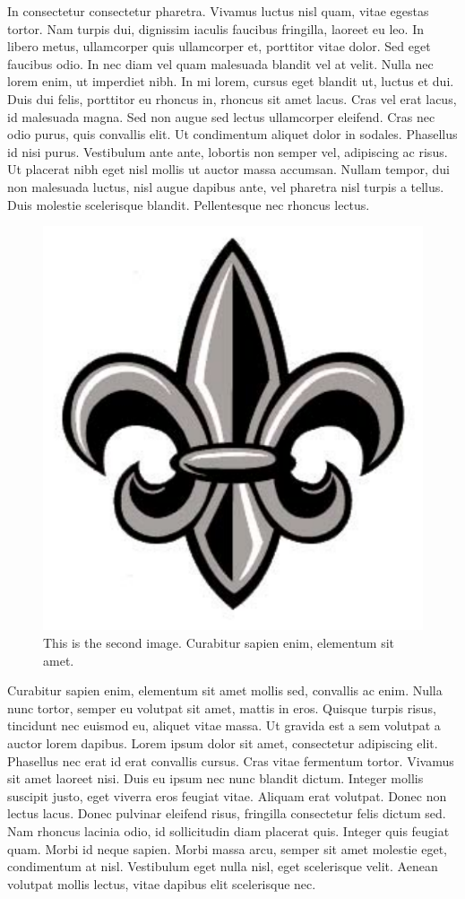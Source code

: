 \documentclass[12pt]{report}	%
\begin{document}
  In consectetur consectetur pharetra. Vivamus luctus nisl quam, vitae egestas tortor. Nam turpis dui, dignissim iaculis faucibus fringilla, laoreet eu leo. In libero metus, ullamcorper quis ullamcorper et, porttitor vitae dolor. Sed eget faucibus odio. In nec diam vel quam malesuada blandit vel at velit. Nulla nec lorem enim, ut imperdiet nibh. In mi lorem, cursus eget blandit ut, luctus et dui. Duis dui felis, porttitor eu rhoncus in, rhoncus sit amet lacus. Cras vel erat lacus, id malesuada magna. Sed non augue sed lectus ullamcorper eleifend. Cras nec odio purus, quis convallis elit. Ut condimentum aliquet dolor in sodales. Phasellus id nisi purus. Vestibulum ante ante, lobortis non semper vel, adipiscing ac risus. Ut placerat nibh eget nisl mollis ut auctor massa accumsan. Nullam tempor, dui non malesuada luctus, nisl augue dapibus ante, vel pharetra nisl turpis a tellus. Duis molestie scelerisque blandit. Pellentesque nec rhoncus lectus.
\begin{figure}[htb]
  \centering
  \includegraphics[draft=false,width=0.4\linewidth]{ull2.pdf}
  \caption{This is the second image. Curabitur sapien enim, elementum sit amet.}
  \label{fig:ull2}
\end{figure}
  
  Curabitur sapien enim, elementum sit amet mollis sed, convallis ac enim. Nulla nunc tortor, semper eu volutpat sit amet, mattis in eros. Quisque turpis risus, tincidunt nec euismod eu, aliquet vitae massa. Ut gravida est a sem volutpat a auctor lorem dapibus. Lorem ipsum dolor sit amet, consectetur adipiscing elit. Phasellus nec erat id erat convallis cursus. Cras vitae fermentum tortor. Vivamus sit amet laoreet nisi. Duis eu ipsum nec nunc blandit dictum. Integer mollis suscipit justo, eget viverra eros feugiat vitae. Aliquam erat volutpat. Donec non lectus lacus. Donec pulvinar eleifend risus, fringilla consectetur felis dictum sed. Nam rhoncus lacinia odio, id sollicitudin diam placerat quis. Integer quis feugiat quam. Morbi id neque sapien. Morbi massa arcu, semper sit amet molestie eget, condimentum at nisl. Vestibulum eget nulla nisl, eget scelerisque velit. Aenean volutpat mollis lectus, vitae dapibus elit scelerisque nec.
\end{document}
